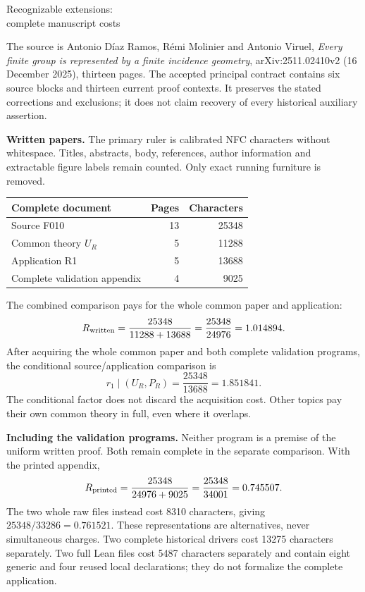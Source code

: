 \documentclass[11pt,a4paper]{article}
\begin{document}
\begin{center}\Large Recognizable extensions:\\complete manuscript costs\end{center}

The source is Antonio Díaz Ramos, Rémi Molinier and Antonio Viruel,
\emph{Every finite group is represented by a finite incidence geometry},
arXiv:2511.02410v2 (16 December 2025), thirteen pages. The accepted
principal contract contains six source blocks and thirteen current proof
contexts. It preserves the stated corrections and exclusions; it does
not claim recovery of every historical auxiliary assertion.

\textbf{Written papers.}
The primary ruler is calibrated NFC characters without whitespace.
Titles, abstracts, body, references, author information and extractable
figure labels remain counted. Only exact running furniture is removed.
\begin{center}\begin{tabular}{lrr}\toprule
Complete document & Pages & Characters\\\midrule
Source F010 & 13 & 25348\\
Common theory $U_R$ & 5 & 11288\\
Application R1 & 5 & 13688\\
Complete validation appendix & 4 & 9025\\\bottomrule
\end{tabular}\end{center}
The combined comparison pays for the whole common paper and application:
\[
 R_{\rm written}=\frac{25348}{11288+13688}
 =\frac{25348}{24976}=1.014894.
\]
After acquiring the whole common paper and both complete validation
programs, the conditional source/application comparison is
\[
 r_1\mid(U_R,P_R)=\frac{25348}{13688}=1.851841.
\]
The conditional factor does not discard the acquisition cost. Other
topics pay their own common theory in full, even where it overlaps.

\textbf{Including the validation programs.}
Neither program is a premise of the uniform written proof. Both remain
complete in the separate comparison. With the printed appendix,
\[
 R_{\rm printed}=\frac{25348}{24976+9025}
 =\frac{25348}{34001}=0.745507.
\]
The two whole raw files instead cost 8310 characters, giving
$25348/33286=0.761521$. These representations are alternatives,
never simultaneous charges. Two complete historical drivers cost
13275 characters separately. Two full Lean files cost 5487
characters separately and contain eight generic and four reused local
declarations; they do not formalize the complete application.
\end{document}

